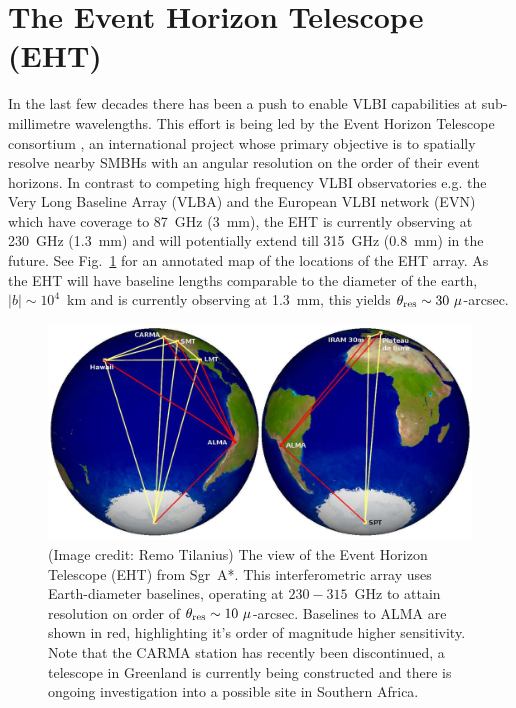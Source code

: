 \section{The Event Horizon Telescope (EHT)}

In the last few decades there has been a push to enable VLBI capabilities at sub-millimetre wavelengths. This effort is being led by the Event Horizon Telescope consortium \citep[(EHT),][]{Doeleman_2010}, an international project whose primary objective is to spatially resolve nearby SMBHs with an angular resolution on the order of their event horizons. In contrast to competing high frequency VLBI observatories e.g. the Very Long Baseline Array (VLBA) and the European VLBI network (EVN) which have coverage to 87~GHz (3~mm), the EHT is currently observing at 230~GHz (1.3~mm) and will potentially extend till 315~GHz (0.8~mm) in the future. See Fig.~\ref{fig:eht_globe} for an annotated map of the locations of the EHT array. As the EHT will have baseline lengths comparable to the diameter of the earth, $|b| \sim 10^4$~km and is currently observing at 1.3~mm, this yields $\theta_{\rm res} \sim 30\ \mu$-arcsec.

\begin{figure}
\includegraphics[width=0.8\columnwidth]{Images/eht_globe}
\caption{(Image credit: Remo Tilanius) The view of the Event Horizon Telescope (EHT) from Sgr~A*. This interferometric array uses Earth-diameter baselines, operating at $230-315$~GHz to attain resolution on order of ${\theta_{\rm res} \sim 10\ \mu}$-arcsec. Baselines to ALMA are shown in red, highlighting it's order of magnitude higher sensitivity. Note that the CARMA station has recently been discontinued, a telescope in Greenland is currently being constructed and there is ongoing investigation into a possible site in Southern Africa.\label{fig:eht_globe}%
}
\end{figure}


